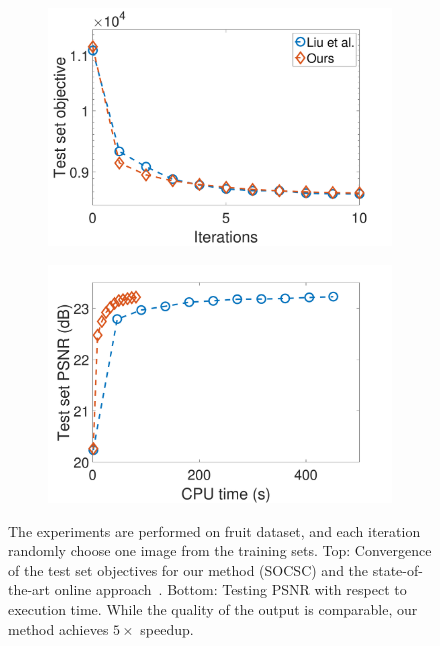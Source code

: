 \begin{figure}[h]
\centering
\begin{subfigure}{0.49\textwidth}
  \includegraphics[width=1\linewidth]{figure/onlineVSliu-ite-fruit.pdf}
\end{subfigure}
\begin{subfigure}{0.49\textwidth}
  \includegraphics[width=1\linewidth]{figure/onlineVSliu-time-fruit.pdf}
\end{subfigure}

\caption{The experiments are performed on fruit dataset, and each iteration randomly choose one image from the training sets. Top: Convergence of the test set objectives for our method (SOCSC) and the state-of-the-art online approach~\cite{liu-2018-first}. Bottom: Testing PSNR with respect to execution time. While the quality of the output is comparable, our method achieves $5 \times$ speedup.}
\label{fig:onlineSmall}
\end{figure}

